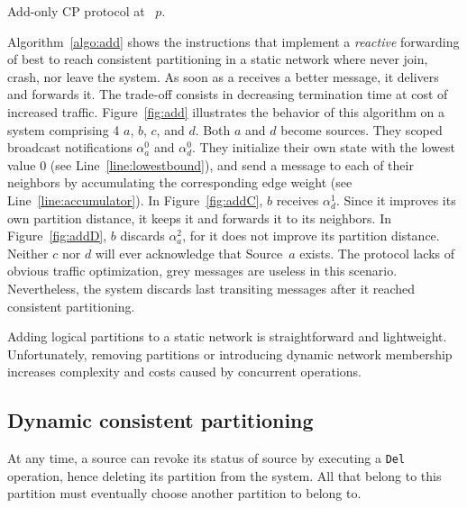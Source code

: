 \begin{algorithm}[t]
  
  \caption{\label{algo:add}Add-only CP protocol at \Process~$p$.}
\end{algorithm}

Algorithm~\ref{algo:add} shows the instructions that implement a
\emph{reactive} forwarding of best to reach consistent partitioning in
a static network where \processes never join, crash, nor leave the
system. As soon as a \process receives a better message, it delivers
and forwards it. The trade-off consists in decreasing termination time
at cost of increased traffic.  Figure~\ref{fig:add} illustrates the
behavior of this algorithm on a system comprising 4 \processes $a$,
$b$, $c$, and $d$. Both $a$ and $d$ become sources.  They scoped broadcast
notifications $\alpha_a^0$ and $\alpha_d^0$. They initialize their own
state with the lowest value $0$ (see Line~\ref{line:lowestbound}), and
send a message to each of their neighbors by accumulating the
corresponding edge weight (see Line~\ref{line:accumulator}). In
Figure~\ref{fig:addC}, $b$ receives $\alpha_{d}^{1}$. Since it
improves its own partition distance, it keeps it and forwards it to
its neighbors. In Figure~\ref{fig:addD}, $b$ discards
$\alpha_{a}^{2}$, for it does not improve its partition
distance. Neither $c$ nor $d$ will ever acknowledge that Source~$a$
exists.  The protocol lacks of obvious traffic optimization, \eg grey
messages are useless in this scenario. Nevertheless, the system
discards last transiting messages after it reached consistent
partitioning.

Adding logical partitions to a static network is straightforward and
lightweight. Unfortunately, removing partitions or introducing dynamic
network membership increases complexity and costs caused by concurrent
operations.

\subsection{Dynamic consistent partitioning}
\label{subsec:dynamic}

At any time, a source can revoke its status of source by executing a
\texttt{Del} operation, hence deleting its partition from the
system. All \processes that belong to this partition must eventually
choose another partition to belong to.




